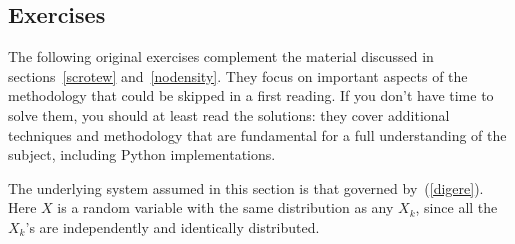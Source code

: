 \documentclass[oneside,10pt]{book}
\begin{document}




\subsection{Exercises}\label{jeporei}

The following original exercises complement the material discussed in sections~\ref{scrotew}
  and~\ref{nodensity}. They focus on important aspects of the methodology that could be skipped in a first reading. If you don't have time to solve them, you should at least read the solutions: they cover additional techniques
 and methodology that are fundamental for a full understanding of the subject, including Python implementations.

The underlying system
 assumed in this section is that governed by~(\ref{digere}). Here $X$ is a random variable with the same
 distribution as any $X_k$, since  all the $X_k$'s are
independently and identically distributed.

\pagebreak
\end{document}
